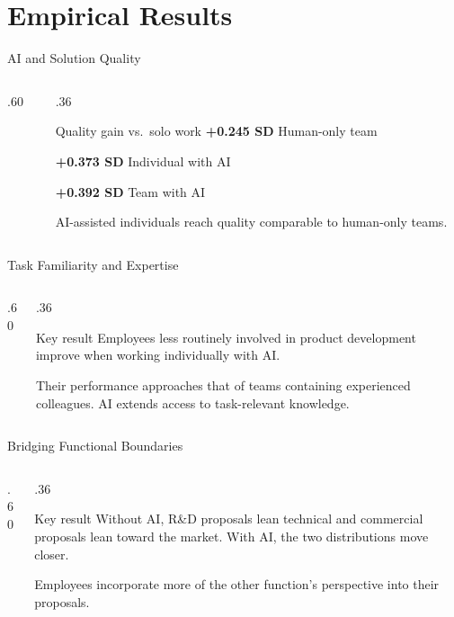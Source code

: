 \section{Empirical Results}
\begin{frame}[t]{AI and Solution Quality}
\small
\begin{columns}[T,onlytextwidth]
\begin{column}{.60\textwidth}
\end{column}
\begin{column}{.36\textwidth}
\begin{block}{Quality gain vs.\ solo work}
\textbf{+0.245 SD} Human-only team\par\smallskip
\textbf{+0.373 SD} Individual with AI\par\smallskip
\textbf{+0.392 SD} Team with AI
\end{block}
\medskip
AI-assisted individuals reach quality comparable to human-only teams.
\end{column}
\end{columns}
\end{frame}

\begin{frame}[t]{Task Familiarity and Expertise}
\small
\begin{columns}[T,onlytextwidth]
\begin{column}{.60\textwidth}
\end{column}
\begin{column}{.36\textwidth}
\begin{block}{Key result}
Employees less routinely involved in product development improve when working individually with AI.
\end{block}
\medskip
Their performance approaches that of teams containing experienced colleagues. AI extends access to task-relevant knowledge.
\end{column}
\end{columns}
\end{frame}

\begin{frame}[t]{Bridging Functional Boundaries}
\small
\begin{columns}[T,onlytextwidth]
\begin{column}{.60\textwidth}
\end{column}
\begin{column}{.36\textwidth}
\begin{block}{Key result}
Without AI, R\&D proposals lean technical and commercial proposals lean toward the market. With AI, the two distributions move closer.
\end{block}
\medskip
Employees incorporate more of the other function's perspective into their proposals.
\end{column}
\end{columns}
\end{frame}

